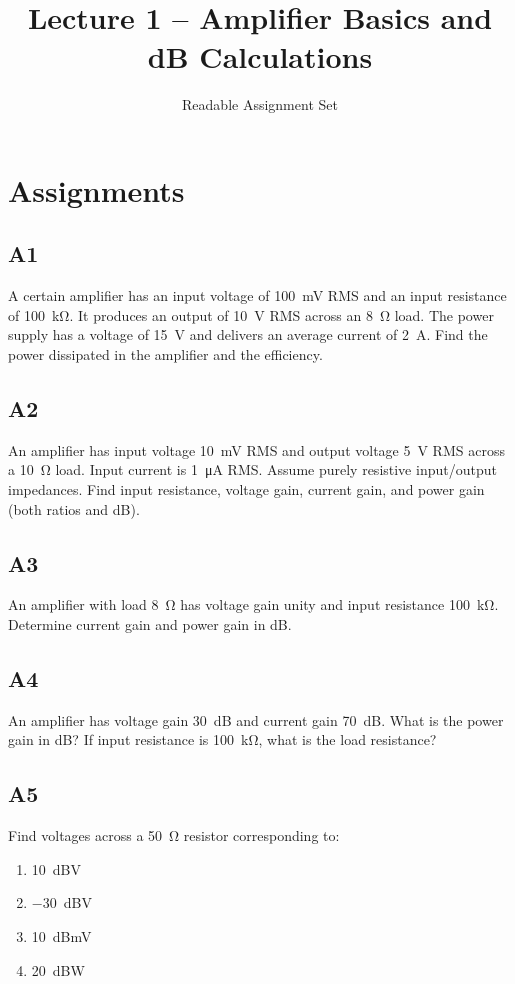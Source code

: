 \documentclass[12pt,a4paper]{article}
\title{Lecture 1 -- Amplifier Basics and dB Calculations}
\author{Readable Assignment Set}
\date{}
\begin{document}
\maketitle
\tableofcontents

\section{Assignments}
\subsection{A1}
A certain amplifier has an input voltage of \SI{100}{mV} RMS and an input resistance of \SI{100}{\kilo\ohm}. It produces an output of \SI{10}{V} RMS across an \SI{8}{\ohm} load. The power supply has a voltage of \SI{15}{V} and delivers an average current of \SI{2}{A}. Find the power dissipated in the amplifier and the efficiency.

\subsection{A2}
An amplifier has input voltage \SI{10}{mV} RMS and output voltage \SI{5}{V} RMS across a \SI{10}{\ohm} load. Input current is \SI{1}{\micro A} RMS. Assume purely resistive input/output impedances. Find input resistance, voltage gain, current gain, and power gain (both ratios and dB).

\subsection{A3}
An amplifier with load \SI{8}{\ohm} has voltage gain unity and input resistance \SI{100}{\kilo\ohm}. Determine current gain and power gain in dB.

\subsection{A4}
An amplifier has voltage gain \SI{30}{dB} and current gain \SI{70}{dB}. What is the power gain in dB? If input resistance is \SI{100}{\kilo\ohm}, what is the load resistance?

\subsection{A5}
Find voltages across a \SI{50}{\ohm} resistor corresponding to:
\begin{enumerate}[label=\alph*)]
\item \SI{10}{dBV}
\item \SI{-30}{dBV}
\item \SI{10}{dBmV}
\item \SI{20}{dBW}
\end{enumerate}
\end{document}
